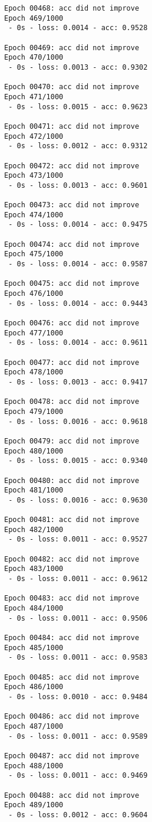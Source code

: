 \documentclass[11pt]{article}
\begin{document}
\begin{Verbatim}[commandchars=\\\{\}]
Epoch 00468: acc did not improve
Epoch 469/1000
 - 0s - loss: 0.0014 - acc: 0.9528

Epoch 00469: acc did not improve
Epoch 470/1000
 - 0s - loss: 0.0013 - acc: 0.9302

Epoch 00470: acc did not improve
Epoch 471/1000
 - 0s - loss: 0.0015 - acc: 0.9623

Epoch 00471: acc did not improve
Epoch 472/1000
 - 0s - loss: 0.0012 - acc: 0.9312

Epoch 00472: acc did not improve
Epoch 473/1000
 - 0s - loss: 0.0013 - acc: 0.9601

Epoch 00473: acc did not improve
Epoch 474/1000
 - 0s - loss: 0.0014 - acc: 0.9475

Epoch 00474: acc did not improve
Epoch 475/1000
 - 0s - loss: 0.0014 - acc: 0.9587

Epoch 00475: acc did not improve
Epoch 476/1000
 - 0s - loss: 0.0014 - acc: 0.9443

Epoch 00476: acc did not improve
Epoch 477/1000
 - 0s - loss: 0.0014 - acc: 0.9611

Epoch 00477: acc did not improve
Epoch 478/1000
 - 0s - loss: 0.0013 - acc: 0.9417

Epoch 00478: acc did not improve
Epoch 479/1000
 - 0s - loss: 0.0016 - acc: 0.9618

Epoch 00479: acc did not improve
Epoch 480/1000
 - 0s - loss: 0.0015 - acc: 0.9340

Epoch 00480: acc did not improve
Epoch 481/1000
 - 0s - loss: 0.0016 - acc: 0.9630

Epoch 00481: acc did not improve
Epoch 482/1000
 - 0s - loss: 0.0011 - acc: 0.9527

Epoch 00482: acc did not improve
Epoch 483/1000
 - 0s - loss: 0.0011 - acc: 0.9612

Epoch 00483: acc did not improve
Epoch 484/1000
 - 0s - loss: 0.0011 - acc: 0.9506

Epoch 00484: acc did not improve
Epoch 485/1000
 - 0s - loss: 0.0011 - acc: 0.9583

Epoch 00485: acc did not improve
Epoch 486/1000
 - 0s - loss: 0.0010 - acc: 0.9484

Epoch 00486: acc did not improve
Epoch 487/1000
 - 0s - loss: 0.0011 - acc: 0.9589

Epoch 00487: acc did not improve
Epoch 488/1000
 - 0s - loss: 0.0011 - acc: 0.9469

Epoch 00488: acc did not improve
Epoch 489/1000
 - 0s - loss: 0.0012 - acc: 0.9604


\end{Verbatim}
\end{document}
